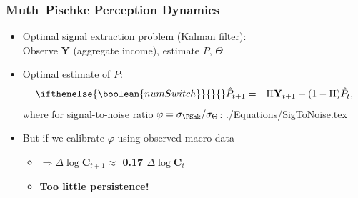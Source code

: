 \documentclass{beamer}\usepackage{dcolumn}
\newcommand{\jbemph}[1]{\textbf{\color{SlideNavy}#1}}
\providecommand{\ifnumSw}{\ifthenelse{\boolean{numSwitch}}{}{\nonumber}}
\providecommand{\econtexRoot}{.}
\providecommand{\eq}{\econtexRoot/Equations}
\begin{document}
\begin{frame}
\frametitle{Muth--Pischke Perception Dynamics}


\begin{itemize}
\item Optimal signal extraction problem (Kalman filter):\\
Observe $\mathbf{Y}$ (aggregate income), estimate $P$, $\Theta$
\item Optimal estimate of ${P}$:
\begin{eqnarray*}
   \ifnumSw  \hat{{P}}_{t+1} & = & \Pi \mathbf{Y}_{t+1} + (1-\Pi) \hat{{P}}_{t},
\end{eqnarray*}
where for signal-to-noise ratio $\varphi = \sigma_{\PShk}/\sigma_{\Theta}$:
 \eq/SigToNoise.tex
\item But if we calibrate $\varphi$ using observed macro data
  \begin{itemize}

\item \jbemph{$\Rightarrow \Delta \log \mathbf{C}_{t+1} \approx $ 0.17 $ \Delta \log \mathbf{C}_{t}$}
\item \jbemph{Too little persistence!
}
\end{itemize}
\end{itemize}

\end{frame}
\end{document}
